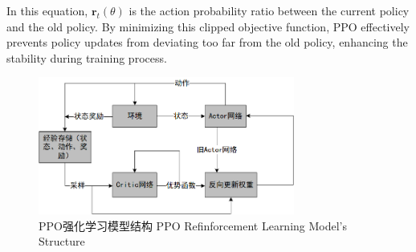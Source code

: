 In this equation, \( \boldsymbol{r}_t(\theta) \) is the action probability ratio between the current policy and the old policy. By minimizing this clipped objective function, PPO effectively prevents policy updates from deviating too far from the old policy, enhancing the stability during training process.

\begin{figure}[hbt]
	\centering
	\includegraphics[width=0.75\textwidth]{figures/2.6}
	\caption{PPO强化学习模型结构 PPO Refinforcement Learning Model's Structure}\label{fig:2.6}
\end{figure}

